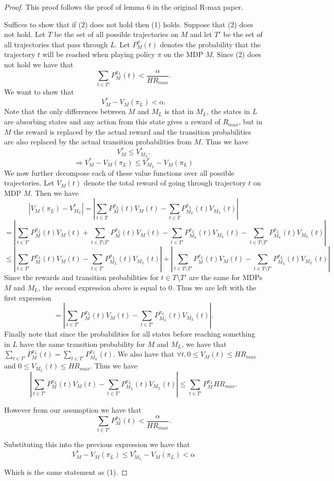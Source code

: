 \documentclass[12pt, letterpaper]{article}
\theoremstyle{definition}
\theoremstyle{remark}
\begin{document}
\begin{proof}[Proof]
    This proof follows the proof of lemma 6 in the original R-max paper.

    Suffices to show that if (2) does not hold then (1) holds. Suppose that (2) does not hold. Let \(T\) be the set of all possible trajectories on \(M\) and let \(T'\) be the set of all trajectories that pass through \(L\). Let \(P_M^{\pi}(t)\) denotes the probability that the trajectory \(t\) will be reached when playing policy \(\pi\) on the MDP \(M\).  Since (2) does not hold we have that
    \[\sum_{t \in T'} P_{M}^{\pi_L}(t) < \frac{\alpha}{H R_{max}}.\]
    We want to show that
    \[V^*_{M} - V_{M}(\pi_L) < \alpha.\]
    Note that the only differences between \(M\) and \(M_L\) is that in \(M_L\), the states in \(L\) are absorbing states and any action from this state gives a reward of \(R_{max}\), but in \(M\) the reward is replaced by the actual reward and the transition probabilities are also replaced by the actual transition probabilities from \(M\). Thus we have
    \[V^*_{M} \leq V^*_{M_L}.\]
    \[\Rightarrow V^*_{M} - V_{M}(\pi_L) \leq V^*_{M_L} - V_{M}(\pi_L)\]
    We now further decompose each of these value functions over all possible trajectories. Let \(V_{M}(t)\) denote the total reward of going through trajectory \(t\) on MDP \(M\). Then we have
    \[ |V_{M}(\pi_L) - V_{M_L}^* | = |\sum_{t \in T} P_{M}^{\pi_L}(t) V_{M}(t) - \sum_{t \in T} P_{M_L}^{\pi_L}(t) V_{M_L}(t)|\]
    \[= |\sum_{t \in T'} P_{M}^{\pi_L}(t) V_{M}(t) + \sum_{t \in T \setminus T'} P_{M}^{\pi_L}(t) V_{M}(t) - \sum_{t \in T'} P_{M_L}^{\pi_L}(t) V_{M_L}(t) - \sum_{t \in T \setminus T'} P_{M_L}^{\pi_L}(t) V_{M_L}(t)|\]
    \[\leq |\sum_{t \in T'} P_{M}^{\pi_L}(t) V_{M}(t) - \sum_{t \in T'} P_{M_L}^{\pi_L}(t) V_{M_L}(t)| + |\sum_{t \in T \setminus T'} P_{M}^{\pi_L}(t) V_{M}(t) -  \sum_{t \in T \setminus T'} P_{M_L}^{\pi_L}(t) V_{M_L}(t)|\]
    Since the rewards and transition probabilities for \(t \in T \setminus T'\) are the same for MDPs \(M\) and \(M_L\), the second expression above is equal to 0. Thus we are left with the first expression
    \[= |\sum_{t \in T'} P_{M}^{\pi_L}(t) V_{M}(t) - \sum_{t \in T'} P_{M_L}^{\pi_L}(t) V_{M_L}(t)|.\]
    Finally note that since the probabilities for all states before reaching something in \(L\) have the same transition probability for \(M\) and \(M_L\), we have that \(\sum_{t \in T'} P_{M}^{\pi_L}(t) = \sum_{t \in T'} P_{M_L}^{\pi_L}(t)\). We also have that \(\forall t, 0 \leq V_{M}(t) \leq HR_{max}\) and \(0 \leq V_{M_L}(t) \leq HR_{max}\). Thus we have
    \[|\sum_{t \in T'} P_{M}^{\pi_L}(t) V_{M}(t) - \sum_{t \in T'} P_{M_L}^{\pi_L}(t) V_{M_L}(t)| \leq \sum_{t \in T'} P_{M}^{\pi_L} H R_{max}.\]
    
    However from our assumption we have that 
    \[\sum_{t \in T'} P_{M}^{\pi_L}(t) < \frac{\alpha}{H R_{max}}.\]

    Substituting this into the previous expression we have that
    \[V^*_{M} - V_{M}(\pi_L) \leq V_{M_L}^{*} - V_M(\pi_L) < \alpha\]
    
    Which is the same statement as (1).
\end{proof}
\end{document}
